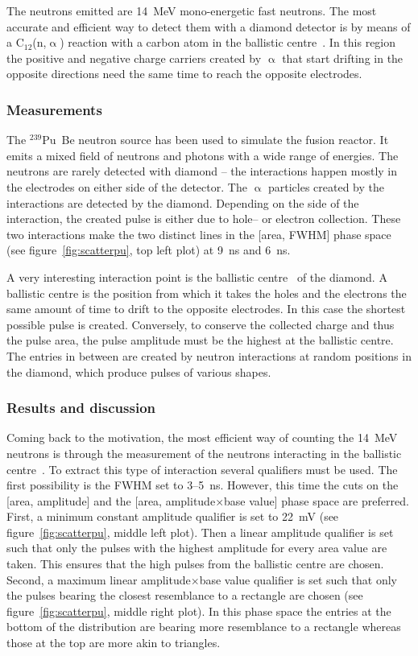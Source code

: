 The neutrons emitted are 14~MeV mono-energetic fast neutrons. The most accurate and efficient way to detect them with a diamond detector is by means of a C$_\mathrm{12}$(n,$\upalpha$) reaction with a carbon atom in the ballistic centre~\cite{PAVEL:00001}. In this region the positive and negative charge carriers created by $\upalpha$ that start drifting in the opposite directions need the same time to reach the opposite electrodes.

\subsubsection{Measurements}
The $^{239}$Pu~Be neutron source has been used to simulate the fusion reactor. It emits a mixed field of neutrons and photons with a wide range of energies. The neutrons are rarely detected with diamond -- the interactions happen mostly in the electrodes on either side of the detector. The $\upalpha$ particles created by the interactions are detected by the diamond. Depending on the side of the interaction, the created pulse is either due to hole-- or electron collection. These two interactions make the two distinct lines in the [area, FWHM] phase space (see figure~\ref{fig:scatterpu}, top left plot) at 9~ns and 6~ns. 

A very interesting interaction point is the ballistic centre~\cite{CHRISSI:00001} of the diamond. A ballistic centre is the position from which it takes the holes and the electrons the same amount of time to drift to the opposite electrodes. In this case the shortest possible pulse is created. Conversely, to conserve the collected charge and thus the pulse area, the pulse amplitude must be the highest at the ballistic centre. The entries in between are created by neutron interactions at random positions in the diamond, which produce pulses of various shapes. 

\subsubsection{Results and discussion}
Coming back to the motivation, the most efficient way of counting the 14~MeV neutrons is through the measurement of the neutrons interacting in the ballistic centre~\cite{????}. To extract this type of interaction several qualifiers must be used. The first possibility is the FWHM set to 3--5~ns. However, this time the cuts on the [area, amplitude] and the [area, amplitude$\times$base value] phase space are preferred. First, a minimum constant amplitude qualifier is set to 22~mV (see figure~\ref{fig:scatterpu}, middle left plot). Then a linear amplitude qualifier is set such that only the pulses with the highest amplitude for every area value are taken. This ensures that the high pulses from the ballistic centre are chosen. Second, a maximum linear amplitude$\times$base value qualifier is set such that only the pulses bearing the closest resemblance to a rectangle are chosen (see figure~\ref{fig:scatterpu}, middle right plot). In this phase space the entries at the bottom of the distribution are bearing more resemblance to a rectangle whereas those at the top are more akin to triangles.

